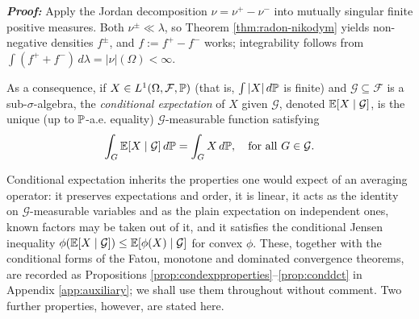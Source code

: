 \vspace{-0.1cm}

\textbf{\textit{Proof:}} Apply the Jordan decomposition $\nu = \nu^+ - \nu^-$ into mutually singular finite positive measures. Both $\nu^{\pm} \ll \lambda$, so Theorem \ref{thm:radon-nikodym} yields non-negative densities $f^{\pm}$, and $f := f^+ - f^-$ works; integrability follows from $\int (f^+ + f^-)\,d\lambda = |\nu|(\Omega) < \infty$. \qedfilledtext

As a consequence, if \(X \in L^1(\Omega, \mathcal{F}, \mathbb{P})\) (that is, $\int |X| \, d\mathbb{P}$ is finite) and \(\mathcal{G} \subseteq \mathcal{F}\) is a sub-\(\sigma\)-algebra, the \emph{conditional expectation} of \(X\) given \(\mathcal{G}\), denoted \(\mathbb{E}[X \mid \mathcal{G}]\), is the unique (up to \(\mathbb{P}\)-a.e. equality) \(\mathcal{G}\)-measurable function satisfying
\begin{equation}\label{eq:condexpdefining}
\int_G \mathbb{E}[X \mid \mathcal{G}] \, d\mathbb{P} = \int_G X \, d\mathbb{P}, \quad \text{for all } G \in \mathcal{G}.
\end{equation}

\vspace{-0.1cm}


Conditional expectation inherits the properties one would expect of an averaging operator: it
preserves expectations and order, it is linear, it acts as the identity on $\mathcal{G}$-measurable
variables and as the plain expectation on independent ones, known factors may be taken out of it, and
it satisfies the conditional Jensen inequality
$\phi(\mathbb{E}[X\mid\mathcal{G}]) \leq \mathbb{E}[\phi(X)\mid\mathcal{G}]$ for convex $\phi$. These, together with the conditional forms of the Fatou, monotone and dominated convergence theorems, are
recorded as Propositions \ref{prop:condexpproperties}--\ref{prop:conddct} in Appendix \ref{app:auxiliary}; we shall use
them throughout without comment. Two further properties, however, are stated here.

